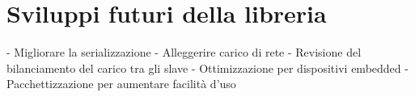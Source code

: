\section{Sviluppi futuri della libreria}
- Migliorare la serializzazione
- Alleggerire carico di rete
- Revisione del bilanciamento del carico tra gli slave
- Ottimizzazione per dispositivi embedded
- Pacchettizzazione per aumentare facilità d'uso